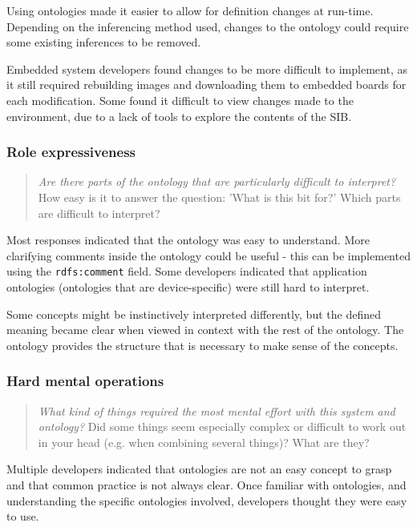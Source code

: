 Using ontologies made it easier to allow for definition changes at run-time. Depending on the inferencing method used, changes to the ontology could require some existing inferences to be removed. 

Embedded system developers found changes to be more difficult to implement, as it still required rebuilding images and downloading them to embedded boards for each modification. Some found it difficult to view changes made to the environment, due to a lack of tools to explore the contents of the \ac{SIB}.


\subsubsection{Role expressiveness}

\begin{quote}
	\emph{Are there parts of the ontology that are particularly difficult to interpret?}
	How easy is it to answer the question: 'What is this bit for?' Which parts are difficult to interpret?
\end{quote}

Most responses indicated that the ontology was easy to understand. More clarifying comments inside the ontology could be useful - this can be implemented using the \texttt{rdfs:comment} field. Some developers indicated that application ontologies (ontologies that are device-specific) were still hard to interpret. 

Some concepts might be instinctively interpreted differently, but the defined meaning became clear when viewed in context with the rest of the ontology. The ontology provides the structure that is necessary to make sense of the concepts.


\subsubsection{Hard mental operations}

\begin{quote}
	\emph{What kind of things required the most mental effort with this system and ontology?}
	Did some things seem especially complex or difficult to work out in your head (e.g. when combining several things)? What are they?
\end{quote}

Multiple developers indicated that ontologies are not an easy concept to grasp and that common practice is not always clear. Once familiar with ontologies, and understanding the specific ontologies involved, developers thought they were easy to use.  

